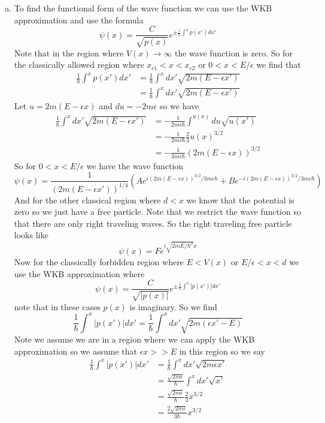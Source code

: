 \documentclass[11pt]{article}
\numberwithin{equation}{section}
\begin{document}
\begin{enumerate}[(a)]
\item
To find the functional form of the wave function we can use the WKB approximation and use the formula
$$\psi(x) = \frac{C}{\sqrt{p(x)}}e^{\pm\frac{i}{\hbar}\int^{x}p(x')dx'}$$
Note that in the region where $V(x)\rightarrow\infty$ the wave function is zero. So for the classically allowed region where $x_{c1}<x<x_{c2}$ or $0<x<E/\epsilon$ we find that
\begin{align*}
\frac{1}{\hbar}\int^xp(x')dx' &= \frac{1}{\hbar}\int^{x}dx'\sqrt{2m(E - \epsilon x')}\\
&= \frac{1}{\hbar}\int^{x}dx'\sqrt{2m(E - \epsilon x')}
\end{align*}
Let $u = 2m(E - \epsilon x)$ and $du = -2m\epsilon$ so we have
\begin{align*}
\frac{1}{\hbar}\int^{x}dx'\sqrt{2m(E - \epsilon x')} &= -\frac{1}{2m\epsilon\hbar}\int^{u(x)}du\sqrt{u(x')}\\
&= -\frac{1}{2m\epsilon\hbar}\frac{2}{3}u(x)^{3/2}\\
&= -\frac{1}{3m\epsilon\hbar}\left(2m(E - \epsilon x)\right)^{3/2}
\end{align*}
So for $0<x<E/\epsilon$ we have the wave function
$$\psi(x) = \frac{1}{(2m(E - \epsilon x'))^{1/4}}\left(Ae^{i\left(2m(E - \epsilon x)\right)^{3/2}/3m\epsilon\hbar} + Be^{-i\left(2m(E - \epsilon x)\right)^{3/2}/3m\epsilon\hbar}\right)$$
And for the other classical region where $d<x$ we know that the potential is zero so we just have a free particle. Note that we restrict the wave function so that there are only right traveling waves. So the right traveling free particle looks like
$$\psi(x) = Fe^{i\sqrt{2mE/\hbar^2} x}$$
Now for the classically forbidden region where $E<V(x)$ or $E/\epsilon<x<d$ we use the WKB approximation where
$$\psi(x) = \frac{C}{\sqrt{|p(x)|}}e^{\pm\frac{1}{\hbar}\int^{x}|p(x')|dx'}$$
note that in these cases $p(x)$ is imaginary. So we find
$$\frac{1}{\hbar}\int^{x}|p(x')|dx' = \frac{1}{\hbar}\int^{x}dx'\sqrt{2m(\epsilon x' - E)}$$
Note we assume we are in a region where we can apply the WKB approximation so we assume that $\epsilon x >> E$ in this region so we say
\begin{align*}
\frac{1}{\hbar}\int^{x}|p(x')|dx' &= \frac{1}{\hbar}\int^{x}dx'\sqrt{2m\epsilon x'}\\
&= \frac{\sqrt{2m\epsilon}}{\hbar}\int^{x}dx'\sqrt{x'}\\
&= \frac{\sqrt{2m\epsilon}}{\hbar}\frac{2}{3}x^{3/2}\\
&= \frac{2\sqrt{2m\epsilon}}{3\hbar}x^{3/2}
\end{align*}

\end{enumerate}
\end{document}
